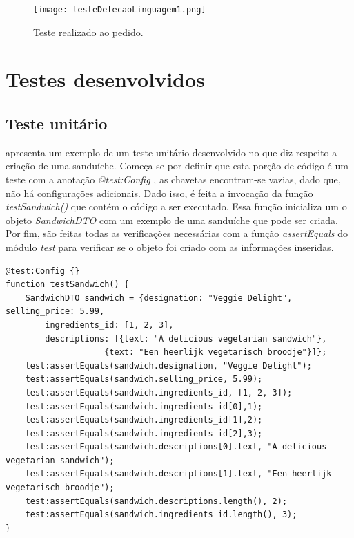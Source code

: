\begin{figure}[H]
	\centering
	\texttt{[image: testeDetecaoLinguagem1.png]}
	\caption{Teste realizado ao pedido.}
	\label{fig:testeDetecao1}
\end{figure}

\section{Testes desenvolvidos}
\subsection{Teste unitário}

 apresenta um exemplo de um teste unitário desenvolvido no que diz respeito a criação de uma sanduíche. Começa-se por definir que esta porção de código é um teste com a anotação \textit{@test:Config {}}, as chavetas encontram-se vazias, dado que, não há configurações adicionais. Dado isso, é feita a invocação da função \textit{testSandwich()} que contém o código a ser executado. Essa função inicializa um o objeto \textit{SandwichDTO} com um exemplo de uma sanduíche que pode ser criada. Por fim, são feitas todas as verificações necessárias com a função \textit{assertEquals} do módulo \textit{test} para verificar se o objeto foi criado com as informações inseridas.

\begin{minipage}{1\linewidth}
\begin{lstlisting}[language=ballerina, caption=Exemplo de teste desenvolvido., label=lst:testeUnitario]
@test:Config {}
function testSandwich() {
    SandwichDTO sandwich = {designation: "Veggie Delight", selling_price: 5.99, 
        ingredients_id: [1, 2, 3], 
        descriptions: [{text: "A delicious vegetarian sandwich"}, 
                    {text: "Een heerlijk vegetarisch broodje"}]};
    test:assertEquals(sandwich.designation, "Veggie Delight");
    test:assertEquals(sandwich.selling_price, 5.99);
    test:assertEquals(sandwich.ingredients_id, [1, 2, 3]);
    test:assertEquals(sandwich.ingredients_id[0],1);
    test:assertEquals(sandwich.ingredients_id[1],2);
    test:assertEquals(sandwich.ingredients_id[2],3);
    test:assertEquals(sandwich.descriptions[0].text, "A delicious vegetarian sandwich");
    test:assertEquals(sandwich.descriptions[1].text, "Een heerlijk vegetarisch broodje");
    test:assertEquals(sandwich.descriptions.length(), 2);
    test:assertEquals(sandwich.ingredients_id.length(), 3);
}
\end{lstlisting}
\end{minipage}

